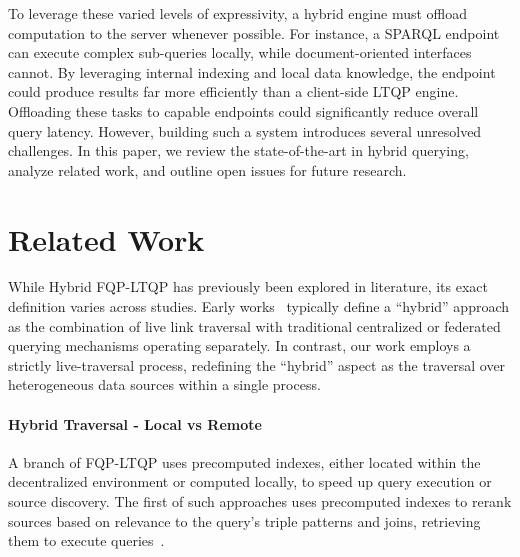 \documentclass{ceurart}
\theoremstyle{definition}
\begin{document}


To leverage these varied levels of expressivity, a hybrid engine must offload computation to the server whenever possible. 
For instance, a SPARQL endpoint can execute complex sub-queries locally, while document-oriented interfaces cannot.
By leveraging internal indexing and local data knowledge, the endpoint could produce results far more efficiently than a client-side LTQP engine.
Offloading these tasks to capable endpoints could significantly reduce overall query latency.
However, building such a system introduces several unresolved challenges. 
In this paper, we review the state-of-the-art in hybrid querying, analyze related work, and outline open issues for future research.

\section{Related Work}

While Hybrid FQP-LTQP has previously been explored in literature, its exact definition varies across studies.
Early works~\cite{umbrich2012hybrid,lynden2013hybrid,hartig2019linked} typically define a ``hybrid'' approach 
as the combination of live link traversal with traditional centralized or federated querying mechanisms operating separately.
In contrast, our work employs a strictly live-traversal process, redefining
the ``hybrid'' aspect as the traversal over heterogeneous data sources within a single process.

\paragraph{Hybrid Traversal - Local vs Remote} A branch of FQP-LTQP uses precomputed indexes,
either located within the decentralized environment or computed locally,
to speed up query execution or source discovery.
The first of such approaches uses precomputed indexes to rerank sources based on relevance to the query's triple patterns and joins,
retrieving them to execute queries~\cite{ladwig2010linked}.
\end{document}
